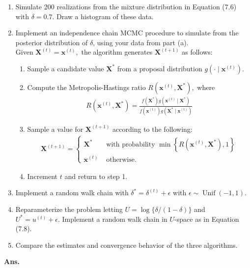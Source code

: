 \documentclass[11pt]{article}
\begin{document}
\begin{enumerate}
    \item Simulate 200 realizations from the mixture distribution in Equation (7.6) with $\delta=0.7.$ Draw a histogram of these data.
    \item Implement an independence chain MCMC procedure to simulate from the posterior distribution of $\delta$, using your data from part (a).\\ 
    Given $\mathbf{X}^{(t)}=\mathbf{x}^{(t)},$ the algorithm generates $\mathbf{X}^{(t+1)}$ as follows:
    \begin{enumerate}
        \item Sample a candidate value $\mathbf{X}^{*}$ from a proposal distribution $g\left(\cdot \mid \mathbf{x}^{(t)}\right)$.
        \item Compute the Metropolis-Hastings ratio $R\left(\mathbf{x}^{(t)}, \mathbf{X}^{*}\right),$ where
    \begin{align*}
        R(\mathbf{x}^{(t)}, \mathbf{X}^{*})=\frac{f(\mathbf{X}^{*}) g(\mathbf{x}^{(t)} \mid \mathbf{X}^{*})}{f(\mathbf{x}^{(t)}) g(\mathbf{X}^{*} \mid \mathbf{x}^{(t)})}
    \end{align*}
        \item Sample a value for $\mathbf{X}^{(t+1)}$ according to the following:
        \begin{align*}
            \mathbf{X}^{(t+1)}=\left\{\begin{array}{ll}
            \mathbf{X}^{*} & \text { with probability } \min \left\{R\left(\mathbf{x}^{(t)}, \mathbf{X}^{*}\right), 1\right\} \\
            \mathbf{x}^{(t)} & \text { otherwise. }
            \end{array}\right.
        \end{align*}
        \item Increment $t$ and return to step 1.
    \end{enumerate}
    \item Implement a random walk chain with $\delta^{*}=\delta^{(t)}+\epsilon$ with $\epsilon \sim \operatorname{Unif}(-1,1).$
    \item Reparameterize the problem letting $U=\log \{\delta /(1-\delta)\}$ and $U^{*}=u^{(t)}+\epsilon .$ Implement a random walk chain in $U$-space as in Equation (7.8).
    \item Compare the estimates and convergence behavior of the three algorithms.
\end{enumerate}
\textbf{Ans.}
\end{document}
